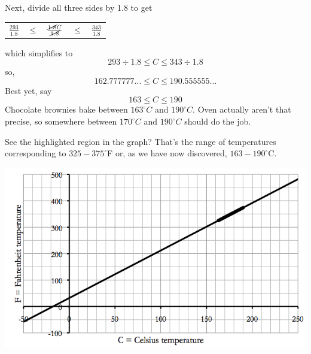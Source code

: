 Next, divide all three sides by 1.8 to get
\begin{center}
\begin{tabular} {ccc cc}
$\frac{293}{1.8}$ & $\le$ &$\frac{\cancel{1.8}C}{\cancel{1.8}}$ &  $\le$ & $\frac{343}{1.8}$ \\
\end{tabular}
\end{center}
\noindent which simplifies to $$293\div 1.8 \le C \le 343 \div 1.8$$ so, $$ 162.777777... \le C \le 190.555555...$$
Best yet, say $$163 \le C \le 190$$  Chocolate brownies bake between $163^\circ C$ and $190^\circ C$.  Oven actually aren't that precise, so somewhere between $170^\circ C$ and $190^\circ C$ should do the job.

See the highlighted region in the graph?  That's the range of temperatures corresponding to $325-375^\circ$F or, as we have now discovered, $163-190^\circ$C.
\begin{center}
 {\includegraphics [width = 6in] {fahrenheitcelsius.png}}
\end{center}



%